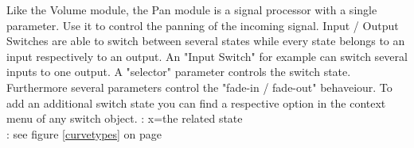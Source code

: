 Like the Volume module, the Pan module is a signal processor with a single parameter. Use it to control the panning of the incoming signal.
	\bParameterlist
	\eParameterlist
Input / Output Switches are able to switch between several states while every state belongs to an input respectively to an output. An "Input Switch" for example can switch several inputs to one output. A "selector" parameter controls the switch state. Furthermore several parameters control the "fade-in / fade-out" behaveiour.
	To add an additional switch state you can find a respective option in the context menu of any switch object.  
	\bParameterlist
	\eParameterlist
\stern : x=the related state \\
\sstern : see figure \ref{curvetypes} on page \pageref{curvetypes}

